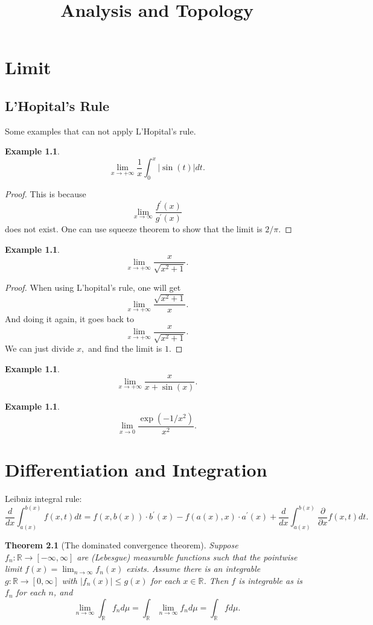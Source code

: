 \documentclass{book}
\title{Analysis and Topology}
\author{}
\date{}
\newtheorem{thm}[defi]{Theorem}
\newtheorem{eg}[defi]{Example}
\numberwithin{equation}{section}
\begin{document}
\maketitle
\tableofcontents
\chapter{Limit}
\section{L'Hopital's Rule}
Some examples that can not apply L'Hopital's rule.
\begin{eg}
$$
 \lim_{x\to +\infty} \frac{1}{x}\int_0^x|\sin(t)|dt.
$$
\end{eg}
\begin{proof}
    This is because 
    $$
    \lim_{x\to \infty} \frac{f^\prime (x)}{g^\prime (x)}
    $$ does not exist. One can use squeeze theorem to show that the limit is $2/\pi.$
\end{proof}

\begin{eg}
$$
 \lim_{x\to +\infty} \frac{x}{\sqrt{x^2+1}}.
$$
\end{eg}
\begin{proof}
    When using L'hopital's rule, one will get
 $$
 \lim_{x\to +\infty} \frac{\sqrt{x^2+1}}{x}. 
$$  And doing it again, it goes back to
$$
 \lim_{x\to +\infty} \frac{x}{\sqrt{x^2+1}}.
$$  We can just divide $x,$ and find the limit is $1.$  
\end{proof}

\begin{eg}
$$
 \lim_{x\to +\infty} \frac{x}{x+\sin(x)}.
$$ 
\end{eg}

\begin{eg}
    $$
 \lim_{x\to 0} \frac{\exp(-1/x^2)}{x^2}.
$$
\end{eg}


\chapter{Differentiation and Integration}
Leibniz integral rule:
$$
\frac{d}{dx}\int_{a(x)}^{b(x)}f(x,t) dt=f(x,b(x))\cdot b^\prime(x)-f(a(x),x)\cdot a^\prime(x)+\frac{d}{dx}\int_{a(x)}^{b(x)}\frac{\partial}{\partial x}f(x,t) dt.
$$

\begin{thm}[The dominated convergence theorem] 
Suppose $f_n: \mathbb{R} \rightarrow [-\infty, \infty]$ are
(Lebesgue) measurable functions such that the pointwise limit $f(x) = \lim_{n\rightarrow \infty}f_n(x)$ exists. Assume there is an integrable $g: \mathbb{R} \rightarrow [0,\infty]$ with $|f_n(x)| \leq g(x)$ for each $x\in\mathbb{R}$. Then $f$ is integrable as is $f_n$ for each $n$, and
$$
\lim_{n\rightarrow \infty} \int_{\mathbb{R}}f_n d\mu=\int_{\mathbb{R}}\lim_{n\rightarrow\infty}f_n d\mu =
\int_{\mathbb{R}}f d\mu.
$$
\end{thm}
\end{document}
